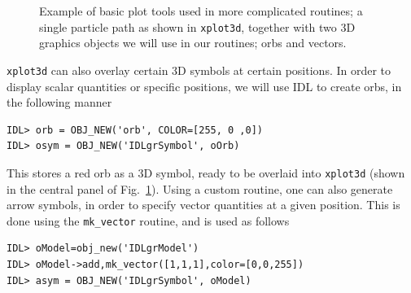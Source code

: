 \documentclass[a4paper,11pt,usenames,dvipsnames]{article}
\begin{document}
\begin{figure}[t]
   \caption{Example of basic plot tools used in more complicated routines; a single particle path as shown in \texttt{xplot3d}, together with two 3D graphics objects we will use in our routines; orbs and vectors.} 
   \label{fig:simples}
 \end{figure}
\texttt{xplot3d} can also overlay certain 3D symbols at certain positions. In order to display scalar quantities or specific positions, we will use IDL to create orbs, in the following manner
\begin{verbatim}
IDL> orb = OBJ_NEW('orb', COLOR=[255, 0 ,0])
IDL> osym = OBJ_NEW('IDLgrSymbol', oOrb)
\end{verbatim}
This stores a red orb as a 3D symbol, ready to be overlaid into \texttt{xplot3d} (shown in the central panel of Fig.~\ref{fig:simples}). Using a custom routine, one can also generate arrow symbols, in order to specify vector quantities at a given position. This is done using the \texttt{mk\_vector} routine, and is used as follows
\begin{verbatim}
IDL> oModel=obj_new('IDLgrModel')
IDL> oModel->add,mk_vector([1,1,1],color=[0,0,255])
IDL> asym = OBJ_NEW('IDLgrSymbol', oModel)
\end{verbatim}
\end{document}

